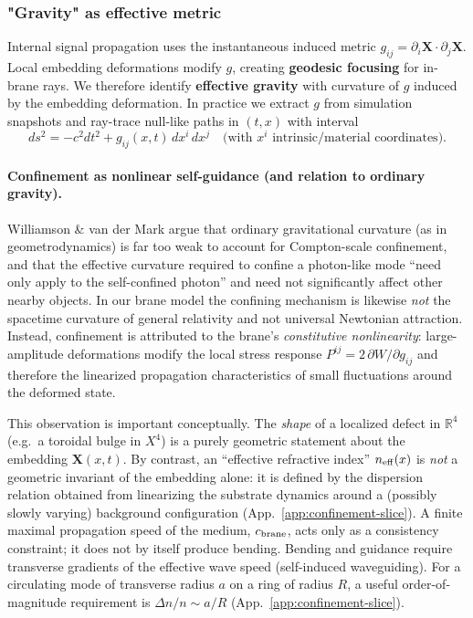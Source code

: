 \subsubsection{"Gravity" as effective metric}\label{gravity-as-effective-metric}

Internal signal propagation uses the instantaneous induced metric $g_{ij}=\partial_i\mathbf X\cdot\partial_j\mathbf X$. Local embedding deformations modify $g$, creating \textbf{geodesic focusing} for in-brane rays. We therefore identify \textbf{effective gravity} with curvature of $g$ induced by the embedding deformation. In practice we extract $g$ from simulation snapshots and ray-trace null-like paths in $(t,x)$ with interval
\begin{equation}
ds^2 = -c^2 dt^2 + g_{ij}(x,t)\,dx^i\, dx^j \quad\text{(with $x^i$ intrinsic/material coordinates)}.
\label{eq:effective-metric-interval}
\end{equation}

\paragraph{Confinement as nonlinear self-guidance (and relation to ordinary gravity).}
Williamson \& van der Mark \cite{WilliamsonVanDerMark1997} argue that ordinary gravitational curvature
(as in geometrodynamics) is far too weak to account for Compton-scale confinement, and that the
effective curvature required to confine a photon-like mode ``need only apply to the self-confined
photon'' and need not significantly affect other nearby objects.
In our brane model the confining mechanism is likewise \emph{not} the spacetime curvature of general
relativity and not universal Newtonian attraction. Instead, confinement is attributed to the brane's
\emph{constitutive nonlinearity}: large-amplitude deformations modify the local stress response
$P^{ij}=2\,\partial W/\partial g_{ij}$ and therefore the linearized propagation characteristics of
small fluctuations around the deformed state.

This observation is important conceptually. The \emph{shape} of a localized defect in $\mathbb R^4$
(e.g.\ a toroidal bulge in $X^4$) is a purely geometric statement about the embedding
$\mathbf X(x,t)$. By contrast, an ``effective refractive index'' $n_{\rm eff}(x)$ is \emph{not} a
geometric invariant of the embedding alone: it is defined by the dispersion relation obtained from
linearizing the substrate dynamics around a (possibly slowly varying) background configuration
(App.~\ref{app:confinement-slice}). A finite maximal propagation speed of the medium, $c_{\rm brane}$,
acts only as a consistency constraint; it does not by itself produce bending. Bending and guidance
require transverse gradients of the effective wave speed (self-induced waveguiding). For a circulating
mode of transverse radius $a$ on a ring of radius $R$, a useful order-of-magnitude requirement is
$\Delta n/n \sim a/R$ (App.~\ref{app:confinement-slice}).


